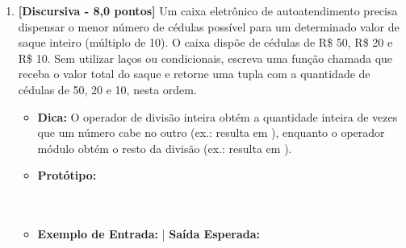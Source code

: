 \begin{enumerate}[label=\textbf{Q\arabic*.}, start=1]
\begin{verbatim}
class SensorSonar(Sensor):
    def __init__(self, identificador: str, profundidade_max: float):
        super().__init__(identificador)
        self.profundidade = profundidade_max
    
    def obter_status(self) -> str:
        msg_base = super().obter_status()
        return f"{msg_base} (Prof: {self.profundidade}m)"
\end{verbatim}
Ao instanciar \texttt{s = SensorSonar("SN-01", 300.0)} e executar \texttt{s.obter\_status()}, qual será o retorno produzido?

\begin{enumerate}[label=\textbf{(\Alph*)}]
    \item \texttt{"Sensor SN-01: ATIVO"}
    \item \texttt{"(Prof: 300.0m)"}
    \item Ocorre um erro de execução (\texttt{AttributeError}), pois \texttt{super()} não pode acessar métodos com o mesmo nome.
    \item \texttt{"Sensor SN-01: ATIVO (Prof: 300.0m)"}
    \item \texttt{"Sensor: None (Prof: 300.0m)"}
\end{enumerate}



\ifmostrarGabarito\else\clearpage\fi

\section*{Parte II: Questões Discursivas e de Programação (Q8 a Q15 — 70,0 Pontos)}

\item \textbf{[Discursiva - 8,0 pontos]} Um caixa eletrônico de autoatendimento precisa dispensar o menor número de cédulas possível para um determinado valor de saque inteiro (múltiplo de 10). O caixa dispõe de cédulas de R\$ 50, R\$ 20 e R\$ 10. Sem utilizar laços ou condicionais, escreva uma função chamada  que receba o valor total do saque e retorne uma tupla com a quantidade de cédulas de 50, 20 e 10, nesta ordem.

\begin{itemize}[leftmargin=*]
    \item \textbf{Dica:} O operador de divisão inteira \code{//} obtém a quantidade inteira de vezes que um número cabe no outro (ex.:  resulta em ), enquanto o operador módulo \code{\%} obtém o resto da divisão (ex.:  resulta em ).
    \item \textbf{Protótipo:}\newline {}\\\\\\
    \item \textbf{Exemplo de Entrada:}  \quad | \quad \textbf{Saída Esperada:} 
\end{itemize}


\end{enumerate}
